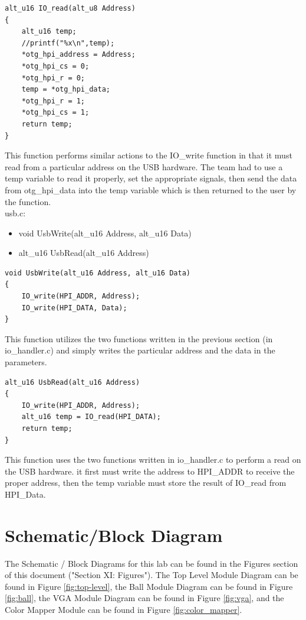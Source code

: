 \documentclass[journal, twocolumn, final,11pt,letterpaper]{IEEEtran}
\begin{document}
\begin{lstlisting}
alt_u16 IO_read(alt_u8 Address)
{
	alt_u16 temp;
	//printf("%x\n",temp);
	*otg_hpi_address = Address;
	*otg_hpi_cs = 0;
	*otg_hpi_r = 0;
	temp = *otg_hpi_data;
	*otg_hpi_r = 1;
	*otg_hpi_cs = 1;
	return temp;
}
\end{lstlisting}
This function performs similar actions to the IO\_write function in that it must read from a particular address on the USB hardware. The team had to use a temp variable to read it properly, set the appropriate signals, then send the data from otg\_hpi\_data into the temp variable which is then returned to the user by the function.\\

usb.c:
\begin{itemize}
	\item 	void UsbWrite(alt\_u16 Address, alt\_u16 Data)
	\item 	alt\_u16 UsbRead(alt\_u16 Address)
\end{itemize}
\begin{lstlisting}
void UsbWrite(alt_u16 Address, alt_u16 Data)
{
	IO_write(HPI_ADDR, Address);
	IO_write(HPI_DATA, Data);
}
\end{lstlisting}
This function utilizes the two functions written in the previous section (in io\_handler.c) and simply writes the particular address and the data in the parameters.


\begin{lstlisting}
alt_u16 UsbRead(alt_u16 Address)
{
	IO_write(HPI_ADDR, Address);
	alt_u16 temp = IO_read(HPI_DATA);
	return temp;
}
\end{lstlisting}
This function uses the two functions written in io\_handler.c to perform a read on the USB hardware. it first must write the address to HPI\_ADDR to receive the proper address, then the temp variable must store the result of IO\_read from HPI\_Data. 



\section{Schematic/Block Diagram}
The Schematic / Block Diagrams for this lab can be found in the Figures section of this document ("Section XI: Figures"). The Top Level Module Diagram can be found in Figure \ref{fig:top-level}, the Ball Module Diagram can be found in Figure \ref{fig:ball}, the VGA Module Diagram can be found in Figure \ref{fig:vga}, and the Color Mapper Module can be found in Figure \ref{fig:color_mapper}.
\end{document}
